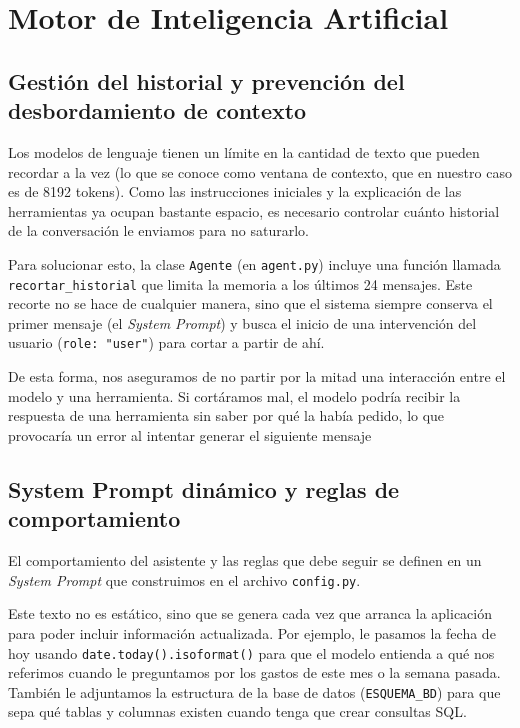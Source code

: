 \section{Motor de Inteligencia Artificial}

\subsection{Gestión del historial y prevención del desbordamiento de contexto}

Los modelos de lenguaje tienen un límite en la cantidad de texto que pueden 
recordar a la vez (lo que se conoce como ventana de contexto, que en nuestro 
caso es de 8192 tokens). Como las instrucciones iniciales y la explicación de 
las herramientas ya ocupan bastante espacio, es necesario controlar cuánto 
historial de la conversación le enviamos para no saturarlo.

Para solucionar esto, la clase \texttt{Agente} (en \texttt{agent.py}) incluye una 
función llamada \texttt{recortar\_historial} que limita la memoria a los últimos 
24 mensajes. Este recorte no se hace de cualquier manera, sino que el sistema siempre conserva el primer mensaje (el 
\textit{System Prompt}) y busca el inicio de una intervención del usuario 
(\texttt{role: "user"}) para cortar a partir de ahí.   

De esta forma, nos aseguramos de no partir por la mitad una interacción entre el 
modelo y una herramienta. Si cortáramos mal, el modelo podría recibir la respuesta
de una herramienta sin saber por qué la había pedido, lo que provocaría un error 
al intentar generar el siguiente mensaje

\subsection{System Prompt dinámico y reglas de comportamiento}

El comportamiento del asistente y las reglas que debe seguir se definen en un 
\textit{System Prompt} que construimos en el archivo \texttt{config.py}.

Este texto no es estático, sino que se genera cada vez que arranca la aplicación 
para poder incluir información actualizada. Por ejemplo, le pasamos la fecha de 
hoy usando \texttt{date.today().isoformat()} para que el modelo entienda a qué 
nos referimos cuando le preguntamos por los gastos de este mes o 
la semana pasada. También le adjuntamos la estructura de la base de datos 
(\texttt{ESQUEMA\_BD}) para que sepa qué tablas y columnas existen cuando tenga 
que crear consultas SQL.



